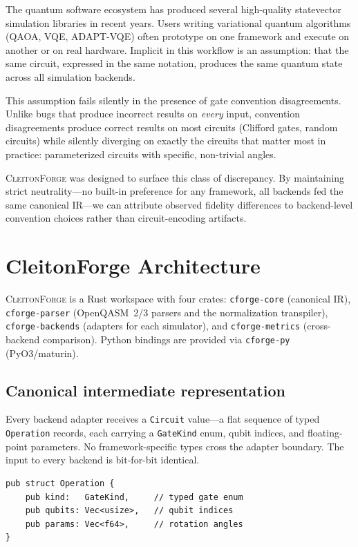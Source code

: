 \documentclass[11pt,a4paper]{article}
\begin{document}
The quantum software ecosystem has produced several high-quality statevector
simulation libraries in recent years. Users writing variational quantum algorithms
(QAOA, VQE, ADAPT-VQE) often prototype on one framework and execute on another
or on real hardware. Implicit in this workflow is an assumption: that the same
circuit, expressed in the same notation, produces the same quantum state across
all simulation backends.

This assumption fails silently in the presence of gate convention
disagreements. Unlike bugs that produce incorrect results on \emph{every} input,
convention disagreements produce correct results on most circuits (Clifford
gates, random circuits) while silently diverging on exactly the circuits that
matter most in practice: parameterized circuits with specific, non-trivial
angles.

\textsc{CleitonForge} was designed to surface this class of discrepancy. By
maintaining strict neutrality---no built-in preference for any framework, all
backends fed the same canonical IR---we can attribute observed fidelity
differences to backend-level convention choices rather than circuit-encoding
artifacts.

\section{CleitonForge Architecture}

\textsc{CleitonForge} is a Rust workspace with four crates: \texttt{cforge-core}
(canonical IR), \texttt{cforge-parser} (OpenQASM~2/3 parsers and the normalization
transpiler), \texttt{cforge-backends} (adapters for each simulator), and
\texttt{cforge-metrics} (cross-backend comparison). Python bindings are provided
via \texttt{cforge-py} (PyO3/maturin).

\subsection{Canonical intermediate representation}

Every backend adapter receives a \texttt{Circuit} value---a flat sequence of
typed \texttt{Operation} records, each carrying a \texttt{GateKind} enum, qubit
indices, and floating-point parameters. No framework-specific types cross the
adapter boundary. The input to every backend is bit-for-bit identical.

\begin{lstlisting}[style=rust, caption={Canonical IR excerpt (\texttt{cforge-core}).}]
pub struct Operation {
    pub kind:   GateKind,     // typed gate enum
    pub qubits: Vec<usize>,   // qubit indices
    pub params: Vec<f64>,     // rotation angles
}
\end{lstlisting}
\end{document}
